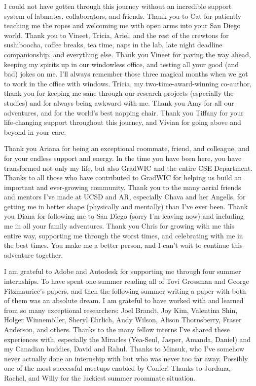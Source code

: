 I could not have gotten through this journey without an incredible support system of labmates, collaborators, and friends. Thank you to Cat for patiently teaching me the ropes and welcoming me with open arms into your San Diego world. Thank you to Vineet, Tricia, Ariel, and the rest of the crewtons for sushiboocha, coffee breaks, tea time, naps in the lab, late night deadline companionship, and everything else. Thank you Vineet for paving the way ahead, keeping my spirits up in our windowless office, and testing all your good (and bad) jokes on me. I'll always remember those three magical months when we got to work in the office with windows. Tricia, my two-time-award-winning co-author, thank you for keeping me sane through our research projects (especially the studies) and for always being awkward with me. Thank you Amy for all our adventures, and for the world's best napping chair. Thank you Tiffany for your life-changing support throughout this journey, and Vivian for going above and beyond in your care.

Thank you Ariana for being an exceptional roommate, friend, and colleague, and for your endless support and energy. In the time you have been here, you have transformed not only my life, but also GradWIC and the entire CSE Department. Thanks to all those who have contributed to GradWIC for helping us build an important and ever-growing community. Thank you to the many aerial friends and mentors I've made at UCSD and AR, especially Chava and her Angells, for getting me in better shape (physically and mentally) than I've ever been. Thank you Diana for following me to San Diego (sorry I'm leaving now) and including me in all your family adventures. Thank you Chris for growing with me this entire way, supporting me through the worst times, and celebrating with me in the best times. You make me a better person, and I can't wait to continue this adventure together.

I am grateful to Adobe and Autodesk for supporting me through four summer internships. To have spent one summer reading all of Tovi Grossman and George Fitzmaurice's papers, and then the following summer writing a paper with both of them was an absolute dream. I am grateful to have worked with and learned from so many exceptional researchers: Joel Brandt, Joy Kim, Valentina Shin, Holger Winnemöller, Sheryl Ehrlich, Andy Wilson, Alison Thornsberry, Fraser Anderson, and others. Thanks to the many fellow interns I've shared these experiences with, especially the Miracles (Yea-Seul, Jasper, Amanda, Daniel) and my Canadian buddies, David and Rahul. Thanks to Minsuk, who I've somehow never actually done an internship with but who was never too far away. Possibly one of the most successful meetups enabled by Confer! Thanks to Jordana, Rachel, and Willy for the luckiest summer roommate situation.

